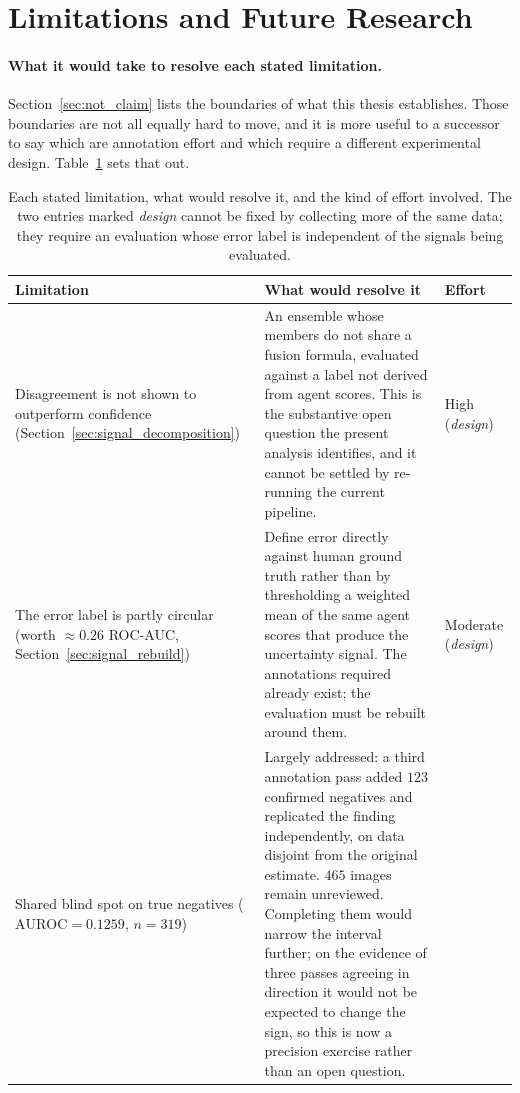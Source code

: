 \documentclass[12pt,a4paper]{report}
\begin{document}
\section{Limitations and Future Research}
\label{sec:limitations}

\paragraph{What it would take to resolve each stated limitation.} Section~\ref{sec:not_claim} lists the boundaries of what this thesis establishes. Those boundaries are not all equally hard to move, and it is more useful to a successor to say which are annotation effort and which require a different experimental design. Table~\ref{tab:future_work} sets that out.

\begin{table}[!htbp]
\centering
\caption[Each stated limitation, what would resolve it, and the kind of]{Each stated limitation, what would resolve it, and the kind of effort involved. The two entries marked \emph{design} cannot be fixed by collecting more of the same data; they require an evaluation whose error label is independent of the signals being evaluated.}
\label{tab:future_work}
\small
\begin{tabular}{p{3.9cm} p{7.3cm} p{2.2cm}}
\toprule
\textbf{Limitation} & \textbf{What would resolve it} & \textbf{Effort} \\
\midrule
Disagreement is not shown to outperform confidence (Section~\ref{sec:signal_decomposition}) &
An ensemble whose members do not share a fusion formula, evaluated against a label not derived from agent scores. This is the substantive open question the present analysis identifies, and it cannot be settled by re-running the current pipeline. &
High (\emph{design}) \\
\addlinespace
The error label is partly circular (worth $\approx0.26$ ROC-AUC, Section~\ref{sec:signal_rebuild}) &
Define error directly against human ground truth rather than by thresholding a weighted mean of the same agent scores that produce the uncertainty signal. The annotations required already exist; the evaluation must be rebuilt around them. &
Moderate (\emph{design}) \\
\addlinespace
Shared blind spot on true negatives ($\text{AUROC}=0.1259$, $n=319$) &
Largely addressed: a third annotation pass added $123$ confirmed negatives and replicated the finding independently, on data disjoint from the original estimate. $465$ images remain unreviewed. Completing them would narrow the interval further; on the evidence of three passes agreeing in direction it would not be expected to change the sign, so this is now a precision exercise rather than an open question. &

\end{tabular}
\end{table}
\end{document}
